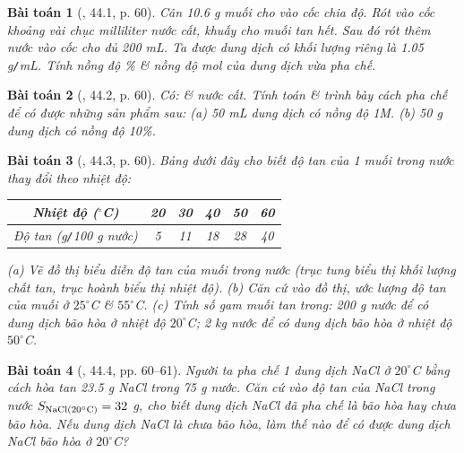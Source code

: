 \documentclass{article}
\newtheorem{baitoan}{Bài toán}
\begin{document}
\begin{baitoan}[\cite{SBT_Hoa_Hoc_8}, 44.1, p. 60]
	Cân \emph{10.6 g} muối \emph{} cho vào cốc chia độ. Rót vào cốc khoảng vài chục milliliter nước cất, khuấy cho muối tan hết. Sau đó rót thêm nước vào cốc cho đủ \emph{200 mL}. Ta được dung dịch \emph{} có khối lượng riêng là \emph{1.05 g\texttt{/}mL}. Tính nồng độ \% \& nồng độ mol của dung dịch vừa pha chế.
\end{baitoan}

\begin{baitoan}[\cite{SBT_Hoa_Hoc_8}, 44.2, p. 60]
	Có: \emph{} \& nước cất. Tính toán \& trình bày cách pha chế để có được những sản phẩm sau: (a) \emph{50 mL} dung dịch \emph{} có nồng độ \emph{1M}. (b) \emph{50 g} dung dịch \emph{} có nồng độ \emph{10\%}.
\end{baitoan}

\begin{baitoan}[\cite{SBT_Hoa_Hoc_8}, 44.3, p. 60]
	Bảng dưới đây cho biết độ tan của 1 muối trong nước thay đổi theo nhiệt độ:
	\begin{table}[H]
		\centering
		\begin{tabular}{|c|c|c|c|c|c|}
			\hline
			Nhiệt độ (${}^\circ$C) & 20 & 30 & 40 & 50 & 60 \\
			\hline
			Độ tan (g\texttt{/}100 g nước) & 5 & 11 & 18 & 28 & 40 \\
			\hline
		\end{tabular}
	\end{table}
	\noindent(a) Vẽ đồ thị biểu diễn độ tan của muối trong nước (trục tung biểu thị khối lượng chất tan, trục hoành biểu thị nhiệt độ). (b) Căn cứ vào đồ thị, ước lượng độ tan của muối ở $25^\circ$\emph{C} \& $55^\circ$\emph{C}. (c) Tính số gam muối tan trong: \emph{200 g} nước để có dung dịch bão hòa ở nhiệt độ $20^\circ$\emph{C}; \emph{2 kg} nước để có dung dịch bão hòa ở nhiệt độ $50^\circ$\emph{C}.
\end{baitoan}

\begin{baitoan}[\cite{SBT_Hoa_Hoc_8}, 44.4, pp. 60--61]
	Người ta pha chế 1 dung dịch \emph{NaCl} ở $20^\circ$\emph{C} bằng cách hòa tan \emph{23.5 g NaCl} trong \emph{75 g} nước. Căn cứ vào độ tan của \emph{NaCl} trong nước $S_{\rm NaCl(20^\circ C)} = 32$ \emph{g}, cho biết dung dịch \emph{NaCl} đã pha chế là bão hòa hay chưa bão hòa. Nếu dung dịch \emph{NaCl} là chưa bão hòa, làm thế nào để có được dung dịch \emph{NaCl} bão hòa ở $20^\circ$\emph{C}?
\end{baitoan}
\end{document}
